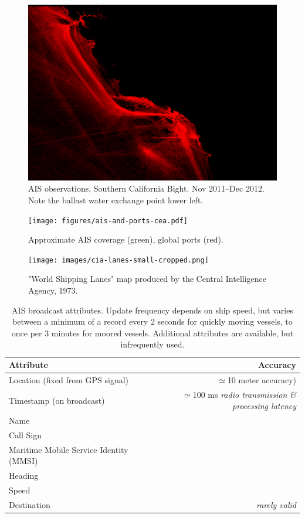 \begin{figure}[htbp]
  \centering
  \includegraphics[width=140mm]{figures/cargo_density.png}
  \caption{AIS observations, Southern California Bight. Nov 2011--Dec 2012. Note the ballast water exchange point lower left.}
  \label{fig:cal-cargo}
\end{figure}

\begin{figure}[htbp]
  \centering
  \texttt{[image: figures/ais-and-ports-cea.pdf]}
  \caption{Approximate AIS coverage (green), global ports (red).}
  \label{fig:ais-coverage}
\end{figure}

\begin{figure}[htbp]
  \centering
  \texttt{[image: images/cia-lanes-small-cropped.png]}
  \caption{"World Shipping Lanes" map produced by the Central Intelligence Agency, 1973.}
  \label{fig:cia-shipping-map}
\end{figure}



\begin{table}[htbp]
  \begin{tabular}{lr}
    Attribute & Accuracy \\
    \hline
    Location (fixed from GPS signal) & $\simeq$10 meter accuracy) \\
    Timestamp (on broadcast) & $\simeq$100 ms \textit{radio transmission \& processing latency}\\
    Name \\
    Call Sign \\
    Maritime Mobile Service Identity (MMSI) \\
    Heading \\
    Speed \\
    Destination & \textit{rarely valid}
  \end{tabular}
  \caption{AIS broadcast attributes. Update frequency depends on ship speed, but varies between a minimum of a record every 2 seconds for quickly moving vessels, to once per 3 minutes for moored vessels. Additional attributes are available, but infrequently used.}
  \label{table:ais-broadcast-attributes}
\end{table}

